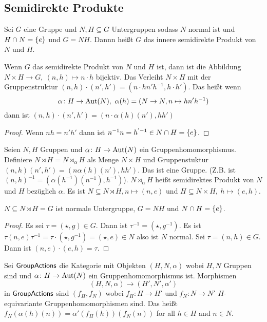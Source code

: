\subsection{Semidirekte Produkte}
\begin{Def}
    Sei $G$ eine Gruppe und $N,H\subseteq  G$ Untergruppen sodass $N$ normal ist und $H\cap N=\{e\}$ und $G=NH$. Dannn heißt $G$ das innere semidirekte Produkt von $N$ und $H$.
\end{Def}
\begin{Bem}
    Wenn $G$ das semidirekte Produkt von $N$ und $H$ ist, dann ist die Abbildung $N\times H\to G,\ (n,h)\mapsto n\cdot h$ bijektiv. Das Verleiht $N\times H$ mit der Gruppenstruktur $(n,h)\cdot (n',h')=(n\cdot hn'h^{-1},h\cdot h')$. Das heißt wenn $$\alpha\colon H\to\Aut(N),\ \alpha(h)=(N\to N, n\mapsto hn'h^{-1})$$ dann ist $(n,h)\cdot(n',h')=(n\cdot\alpha(h)(n'),hh')$
\end{Bem}
\begin{proof}
    Wenn $nh=n'h'$ dann ist $n^{-1}n=h^{'-1}\in N\cap H=\{e\}$.
\end{proof}
\begin{Def}
    Seien $N,H$ Gruppen und $\alpha\colon H\to\operatorname{Aut}(N)$ ein Gruppenhomomorphismus. Definiere $N\rtimes H=N\rtimes_\alpha H$ als Menge $N\times H$ und Gruppenstuktur $(n,h)(n',h')=(n\alpha(h)(n'),hh')$. Das ist eine Gruppe. (Z.B. ist $(n,h)^{-1}=(\alpha(h^{-1})(n^{-1}),h^{-1})$). $N\rtimes_\alpha H$ heißt semidirektes Produkt von $N$ und $H$ bezüglich $\alpha$.
    Es ist $N\subseteq N\rtimes H, n\mapsto (n,e)$ und $H\subseteq N\times H,\ h\mapsto (e,h)$.
\end{Def}
\begin{Lemma}
    $N\subseteq N\rtimes H=G$ ist normale Untergruppe, $G=NH$ und $N\cap H=\{e\}$.
\end{Lemma}
\begin{proof}
    Es sei $\tau=(\star,g)\in G$. Dann ist $\tau^{-1}=(\star,g^{-1})$.
    Es ist $\tau(n,e)\tau^{-1}=\tau\cdot(\star,g^{-1})=(\star,e)\in N$ also ist $N$ normal. 
    Sei $\tau=(n,h)\in G$. Dann ist $(n,e)\cdot (e, h)=\tau$.
\end{proof}
\begin{Def}
    Sei $\mathsf{GroupActions}$ die Kategorie mit Objekten $(H,N,\alpha)$ wobei $H,N$ Gruppen sind und $\alpha\colon H\to\operatorname{Aut}(N)$ ein Gruppenhomomorphismus ist. Morphismen $$(H,N,\alpha)\to (H',N',\alpha')$$ in $\mathsf{GroupActions}$ sind $(f_H,f_N)$ wobei $f_H\colon H\to H'$  und $f_N\colon N\to N'$ $H$-equivariante Gruppenhomomorphismen sind. Das heißt
    $f_N(\alpha(h)(n))=\alpha'(f_H(h))(f_N(n))$ for all $h\in H$ and $n\in N$.
\end{Def}
